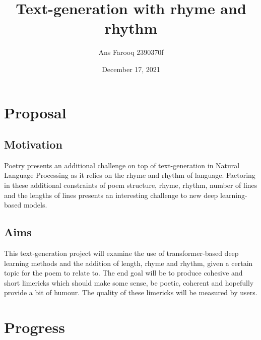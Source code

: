 \documentclass[11pt]{article}
\title{Text-generation with rhyme and rhythm}
\author{Ans Farooq 2390370f}
\date{December 17, 2021}
\begin{document}
    \maketitle
    
    
     



\section{Proposal}\label{proposal}

\subsection{Motivation}\label{motivation}

Poetry presents an additional challenge on top of text-generation in Natural Language 
Processing as it relies on the rhyme and rhythm of language. Factoring in these additional 
constraints of poem structure, rhyme, rhythm, number of lines and the lengths of lines 
presents an interesting challenge to new deep learning-based models.


\subsection{Aims}\label{aims}

This text-generation project will examine the use of transformer-based deep learning 
methods and the addition of length, rhyme and rhythm, given a certain topic for the poem 
to relate to. The end goal will be to produce cohesive and short limericks which should 
make some sense, be poetic, coherent and hopefully provide a bit of humour. The quality of 
these limericks will be measured by users.

\section{Progress}\label{progress}
\end{document}
